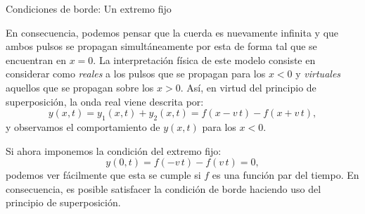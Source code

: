 \documentclass[11pt,handout,aspectratio=1610]{beamer}
\newcommand{\vs}{\vspace{11pt}}
\begin{document}
\begin{frame}{Condiciones de borde: Un extremo fijo}   
    
    En consecuencia, podemos pensar que la cuerda es nuevamente infinita y que ambos pulsos se propagan simultáneamente por esta de forma tal que se encuentran en $x=0$. La interpretación física de este modelo consiste en considerar como \emph{reales} a los pulsos que se propagan para los $x < 0$ y \emph{virtuales} aquellos que se propagan sobre los $x>0$. Así, en virtud del principio de superposición, la onda real viene descrita por: $$ y \left(x,t\right) = y_1 \left(x,t\right) + y_2 \left(x,t\right) = f(x-v \, t) -f \left(x+v \, t\right), $$ y observamos el comportamiento de $y \left(x,t\right)$ para los $x<0$.

    \vs

    Si ahora imponemos la condición del extremo fijo: $$ y \left(0,t\right) = f(-v \, t) - f \left(v \, t\right) = 0, $$ podemos ver fácilmente que esta se cumple si $f$ es una función par del tiempo. En consecuencia, es posible satisfacer la condición de borde haciendo uso del principio de superposición.

\end{frame}
\end{document}
